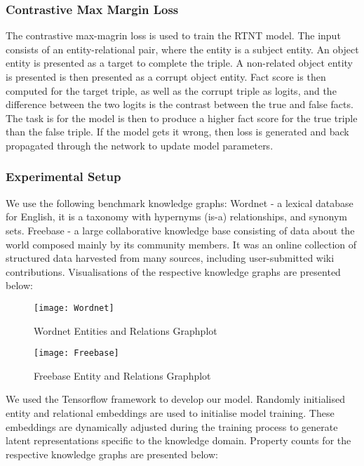 \subsubsection{Contrastive Max Margin Loss}
The contrastive max-magrin loss \cite{reference} is used to train the RTNT model. The input consists of an entity-relational pair, where the entity is a subject entity. An object entity is presented as a target to complete the triple. A non-related object entity is presented is then presented as a corrupt object entity. Fact score is then computed for the target triple, as well as the corrupt triple as logits, and the difference between the two logits is the contrast between the true and false facts. The task is for the model is then to produce a higher fact score for the true triple than the false triple. If the model gets it wrong, then loss is generated and back propagated through the network to update model parameters. \newline

\subsubsection{Experimental Setup} 

We use the following benchmark knowledge graphs: Wordnet - a lexical database for English, it is a taxonomy with hypernyms (is-a) relationships, and synonym sets. \newline
Freebase - a large collaborative knowledge base consisting of data about the world composed mainly by its community members. It was an online collection of structured data harvested from many sources, including user-submitted wiki contributions. \newline
Visualisations of the respective knowledge graphs are presented below:

\begin{figure}[H]
  	\caption{Wordnet Entities and Relations Graphplot}
   	\centering
    	\texttt{[image: Wordnet]}
\end{figure}

\begin{figure}[H]
  	\caption{Freebase Entity and Relations Graphplot}
   	\centering
    	\texttt{[image: Freebase]}
\end{figure}


We used the Tensorflow framework to develop our model. Randomly initialised entity and relational embeddings are used to initialise model training. These embeddings are dynamically adjusted during the training process to generate latent representations specific to the knowledge domain. Property counts for the respective knowledge graphs are presented below:

